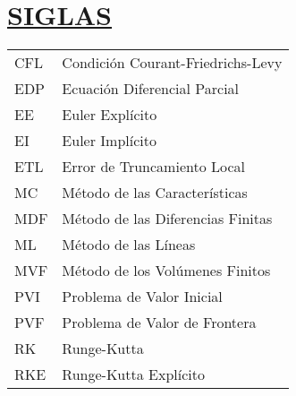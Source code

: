 \section*{\textbf{\underline{SIGLAS}}}

\begin{tabular}{L{1.0 cm}p{11.7 cm}}
	CFL & Condición Courant-Friedrichs-Levy \\
	EDP & Ecuación Diferencial Parcial      \\
	EE  & Euler Explícito                   \\
	EI  & Euler Implícito                   \\
	ETL & Error de Truncamiento Local       \\
	MC  & Método de las Características     \\
	MDF & Método de las Diferencias Finitas \\
	ML  & Método de las Líneas              \\
	MVF & Método de los Volúmenes Finitos   \\
	PVI & Problema de Valor Inicial         \\
	PVF & Problema de Valor de Frontera     \\
	RK  & Runge-Kutta                       \\
	RKE & Runge-Kutta Explícito
\end{tabular}
